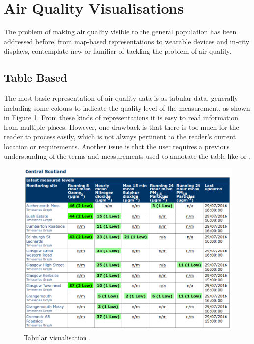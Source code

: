 \section{Air Quality Visualisations}
The problem of making air quality visible to the general population has been addressed before, from map-based representations to wearable devices and in-city displays, contemplate new or familiar of tackling the problem of air quality.

\subsection{Table Based}
The most basic representation of air quality data is as tabular data, generally including some colours to indicate the quality level of the measurement, as shown in Figure \ref{fig:table_based_visualization}. From these kinds of representations it is easy to read information from multiple places. However, one drawback is that there is too much for the reader to process easily, which is not always pertinent to the reader's current location or requirements. Another issue is that the user requires a previous understanding of the terms and measurements used to annotate the table like  or . 

\begin{figure}[H]
\begin{adjustbox}{width=1\textwidth,center=\textwidth}
  \centering
  \includegraphics[scale=1]{images/tabular_data.png}
\end{adjustbox}
  \caption[Tabular visualisation]{Tabular visualisation \cite{DepartmentforEnvironment}.}
  \label{fig:table_based_visualization}
\end{figure}

